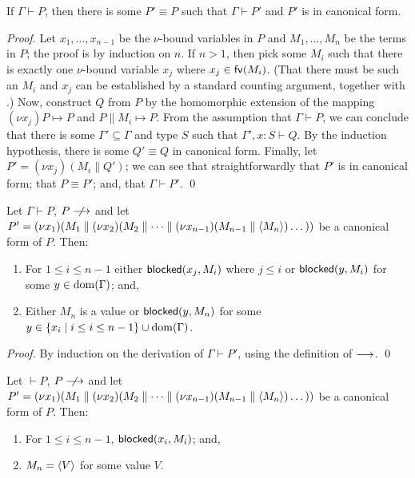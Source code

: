 \documentclass[orivec,envcountsame]{llncs}
\begin{document}
\begin{lemma}\label{thm:canonical}
  If $\Gamma \vdash P$, then there is some $P' \equiv P$ such that $\Gamma \vdash P'$ and $P'$ is in
  canonical form.
\end{lemma}

\begin{proof}
  Let $x_1,\dots,x_{n-1}$ be the $\nu$-bound variables in $P$ and $M_1,\dots,M_n$ be the terms in
  $P$; the proof is by induction on $n$.  If $n > 1$, then pick some $M_i$ such that there is
  exactly one $\nu$-bound variable $x_j$ where $x_j \in \mathsf{fv}(M_i)$.  (That there must be such an
  $M_i$ and $x_j$ can be established by a standard counting argument, together with
  .)  Now, construct $Q$ from $P$ by the homomorphic extension of
  the mapping $(\nu x_j)P \mapsto P$ and $P \parallel M_i \mapsto P$.  From the assumption that
  $\Gamma \vdash P$, we can conclude that there is some $\Gamma' \subseteq \Gamma$ and type $S$ such
  that $\Gamma',x:S \vdash Q$.  By the induction hypothesis, there is some $Q' \equiv Q$ in
  canonical form.  Finally, let $P' = (\nu x_j)(M_i \parallel Q')$; we can see that
  straightforwardly that $P'$ is in canonical form; that $P \equiv P'$; and, that $\Gamma \vdash
  P'$. \qed
\end{proof}

\begin{theorem}\label{thm:progress-open}
  Let $\Gamma \vdash P$, $P \centernot\ceval$ and let $P' = (\nu x_1)(M_1 \parallel (\nu
  x_2)(M_2 \parallel \dots \parallel (\nu x_{n-1})(M_{n-1} \parallel \langle M_n \rangle)\dots))$ be
  a canonical form of $P$.  Then:
  \begin{enumerate}
  \item For $1 \leq i \leq n - 1$ either $\mathsf{blocked}(x_j,M_i)$ where $j \leq i$ or $\mathsf{blocked}(y,M_i)$
    for some $y \in \operatorname{dom}(\Gamma)$; and,
  \item Either $M_n$ is a value or $\mathsf{blocked}(y,M_n)$ for some $y \in \{ x_i \mid i \leq i \leq n -
    1 \} \cup \operatorname{dom}(\Gamma)$.
  \end{enumerate}
\end{theorem}

\begin{proof}
  By induction on the derivation of $\Gamma \vdash P'$, using the definition of $\longrightarrow$. \qed
\end{proof}

\begin{corollary}\label{thm:progress}
  Let $\vdash P$, $P \centernot\ceval$ and let $P' = (\nu x_1)(M_1 \parallel (\nu
  x_2)(M_2 \parallel \dots \parallel (\nu x_{n-1})(M_{n-1} \parallel \langle M_n \rangle)\dots))$ be
  a canonical form of $P$.  Then:
  \begin{enumerate}
  \item For $1 \leq i \leq n - 1$, $\mathsf{blocked}(x_i,M_i)$; and,
  \item $M_n = \langle V \rangle$ for some value $V$.
  \end{enumerate}
\end{corollary}
\end{document}
